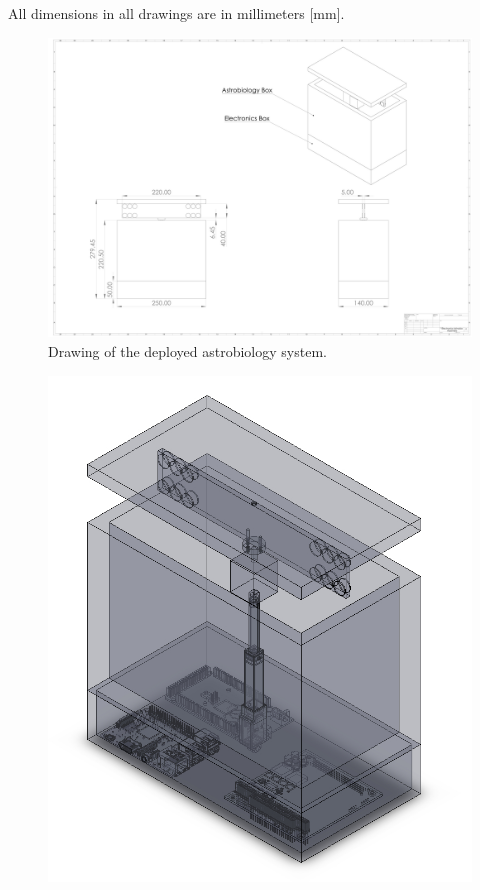 \begin{centering}
  All dimensions in all drawings are in millimeters [\si{\milli\meter}].
  

  \begin{figure}[h]
    \includegraphics[width=\textwidth]{Figures/astrobio-electronics.pdf}
    \caption{Drawing of the deployed astrobiology system.}
    \label{fig:astrobio-electronics-drawing}
  \end{figure}
  \begin{figure}[h]
    \includegraphics[width=\textwidth]{Figures/astrobio-electronics-deployed-transparent.jpg}

\end{figure}
\end{centering}
